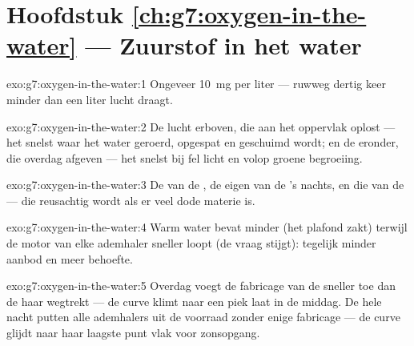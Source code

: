 \section*{Hoofdstuk \ref{ch:g7:oxygen-in-the-water} --- Zuurstof in het water}

\begin{solution}{exo:g7:oxygen-in-the-water:1}
Ongeveer \qty{10}{mg} per liter --- ruwweg dertig keer minder dan een
liter lucht draagt.
\end{solution}

\begin{solution}{exo:g7:oxygen-in-the-water:2}
De lucht erboven, die aan het oppervlak oplost --- het snelst waar het
water geroerd, opgespat en geschuimd wordt; en de  eronder,
die overdag  afgeven --- het snelst bij fel licht en volop groene
begroeiing.
\end{solution}

\begin{solution}{exo:g7:oxygen-in-the-water:3}
De  van de , de eigen  van de  's nachts,
en die van de  --- die reusachtig wordt als er veel dode materie
is.
\end{solution}

\begin{solution}{exo:g7:oxygen-in-the-water:4}
Warm water bevat minder  (het plafond zakt) terwijl de
motor van elke ademhaler sneller loopt (de vraag stijgt): tegelijk minder
aanbod en meer behoefte.
\end{solution}

\begin{solution}{exo:g7:oxygen-in-the-water:5}
Overdag voegt de fabricage van de  sneller  toe dan de
 haar wegtrekt --- de curve klimt naar een piek laat in de
middag. De hele nacht putten alle ademhalers uit de voorraad zonder
enige fabricage --- de curve glijdt naar haar laagste punt vlak voor
zonsopgang.
\end{solution}

